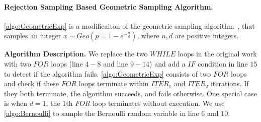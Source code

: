 



\paragraph{Rejection Sampling Based Geometric Sampling Algorithm.}
\label{para:RejectionSamplingBasedGeometricSamplingAlgorithm}

\autoref{algo:GeometricExp} is a modificaiton of the geometric sampling algorithm~\cite{canonne2020discrete}, that samples an integer $x\sim Geo\left( p=1-e^{-\frac{n}{d}}\right)$, where $n,d$ are positive integers.

\textbf{Algorithm Description.}
We replace the two $WHILE$ loops in the original work with two $FOR$ loops (line $4-8$ and line $9-14$) and add a $IF$ condition in line $15$ to detect if the algorithm fails.
\autoref{algo:GeometricExp} consists of two $FOR$ loops and check if these $FOR$ loops terminate within $ITER_1$ and $ITER_2$ iterations. If they both terminate, the algorithm succeeds, and fails otherwise.
One special case is when $d=1$, the $1$th $FOR$ loop terminates without execution.
We use \autoref{algo:Bernoulli} to sample the Bernoulli random variable in line $6$ and $10$.

